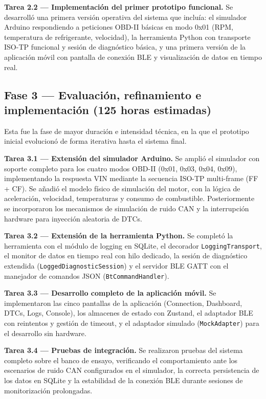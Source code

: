 \textbf{Tarea 2.2 — Implementación del primer prototipo funcional.} Se desarrolló una primera versión operativa del sistema que incluía: el simulador Arduino respondiendo a peticiones OBD-II básicas en modo 0x01 (RPM, temperatura de refrigerante, velocidad), la herramienta Python con transporte ISO-TP funcional y sesión de diagnóstico básica, y una primera versión de la aplicación móvil con pantalla de conexión BLE y visualización de datos en tiempo real.

\subsection{Fase 3 — Evaluación, refinamiento e implementación \textnormal{(125 horas estimadas)}}

Esta fue la fase de mayor duración e intensidad técnica, en la que el prototipo inicial evolucionó de forma iterativa hasta el sistema final.

\textbf{Tarea 3.1 — Extensión del simulador Arduino.} Se amplió el simulador con soporte completo para los cuatro modos OBD-II (0x01, 0x03, 0x04, 0x09), implementando la respuesta VIN mediante la secuencia ISO-TP multi-frame (FF + CF). Se añadió el modelo físico de simulación del motor, con la lógica de aceleración, velocidad, temperaturas y consumo de combustible. Posteriormente se incorporaron los mecanismos de simulación de ruido CAN y la interrupción hardware para inyección aleatoria de DTCs.

\textbf{Tarea 3.2 — Extensión de la herramienta Python.} Se completó la herramienta con el módulo de logging en SQLite, el decorador \texttt{LoggingTransport}, el monitor de datos en tiempo real con hilo dedicado, la sesión de diagnóstico extendida (\texttt{LoggedDiagnosticSession}) y el servidor BLE GATT con el manejador de comandos JSON (\texttt{BtCommandHandler}).

\textbf{Tarea 3.3 — Desarrollo completo de la aplicación móvil.} Se implementaron las cinco pantallas de la aplicación (Connection, Dashboard, DTCs, Logs, Console), los almacenes de estado con Zustand, el adaptador BLE con reintentos y gestión de timeout, y el adaptador simulado (\texttt{MockAdapter}) para el desarrollo sin hardware.

\textbf{Tarea 3.4 — Pruebas de integración.} Se realizaron pruebas del sistema completo sobre el banco de ensayo, verificando el comportamiento ante los escenarios de ruido CAN configurados en el simulador, la correcta persistencia de los datos en SQLite y la estabilidad de la conexión BLE durante sesiones de monitorización prolongadas.


